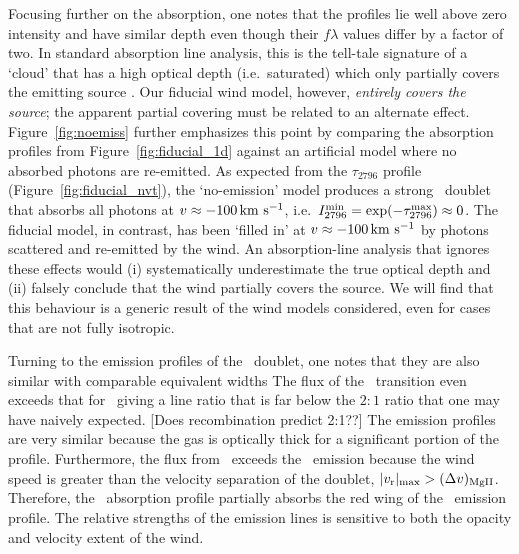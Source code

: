\documentclass[12pt,preprint]{aastex}
\begin{document}
Focusing further on the  absorption, one notes that the profiles lie
well above zero intensity and have similar depth even though their $f\lambda$
values differ by a factor of two.  In standard absorption line
analysis, this is 
the tell-tale signature of a `cloud' that has a high optical depth (i.e.\
saturated) which only partially covers the emitting source
\citep[e.g.][]{hamann+10}.  Our fiducial wind model, however, 
{\it entirely covers the source}; the apparent partial covering must
be related to an alternate effect.
Figure~\ref{fig:noemiss} further emphasizes this point by comparing the 
absorption profiles from Figure~\ref{fig:fiducial_1d} against an
artificial model where no absorbed photons are 
re-emitted.   As expected from the
$\tau_{2796}$ profile (Figure~\ref{fig:fiducial_nvt}), the
`no-emission' model
produces a strong \mgiid\ doublet that absorbs all photons at
$v \approx -100 \, {\rm km~s^{-1}}$, i.e.\ $I_{2796}^{\rm min} = \exp(-\tau^{\rm
  max}_{2796}) \approx 0$.
The fiducial model, in contrast, has been `filled in' at $v \approx -100
\, {\rm km~s^{-1}}$ by photons scattered and re-emitted by the wind.  An
absorption-line analysis that ignores these effects
would (i) systematically underestimate the true optical
depth and (ii) falsely conclude that the wind partially covers the
source.  We will find that this
behaviour is a generic result of the wind models considered, even for cases that are
not fully isotropic.

Turning to the emission profiles of the \mgiid\ doublet, one notes
that they are also similar with comparable equivalent widths The
flux of the \mgiib\ transition even exceeds that for \mgiia\ giving a
line ratio that is far below the $2:1$ ratio that one may have naively
expected. 
[Does recombination predict 2:1??]
The emission profiles are very similar because the gas is optically
thick for a significant portion of the profile. 
Furthermore, the flux from \mgiib\ exceeds the
\mgiia\ emission because the wind speed is greater than the velocity separation
of the doublet, $|v_{\rm r}|_{\rm max} > (\Delta v)_{\rm MgII}$.
Therefore,
the \mgiib\ absorption profile partially absorbs the red wing of the
\mgiia\ emission profile.  The relative strengths of the emission
lines is sensitive to both the opacity and velocity
extent of the wind.  
\end{document}
